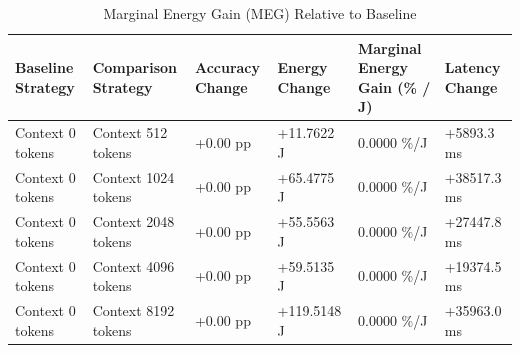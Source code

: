 \begin{table}
\caption{Marginal Energy Gain (MEG) Relative to Baseline}
\label{tab:marginal_energy_gain}
\begin{tabular}{llllll}
\toprule
Baseline Strategy & Comparison Strategy & Accuracy Change & Energy Change & Marginal Energy Gain (\% / J) & Latency Change \\
\midrule
Context 0 tokens & Context 512 tokens & +0.00 pp & +11.7622 J & 0.0000 \%/J & +5893.3 ms \\
Context 0 tokens & Context 1024 tokens & +0.00 pp & +65.4775 J & 0.0000 \%/J & +38517.3 ms \\
Context 0 tokens & Context 2048 tokens & +0.00 pp & +55.5563 J & 0.0000 \%/J & +27447.8 ms \\
Context 0 tokens & Context 4096 tokens & +0.00 pp & +59.5135 J & 0.0000 \%/J & +19374.5 ms \\
Context 0 tokens & Context 8192 tokens & +0.00 pp & +119.5148 J & 0.0000 \%/J & +35963.0 ms \\
\bottomrule
\end{tabular}
\end{table}
